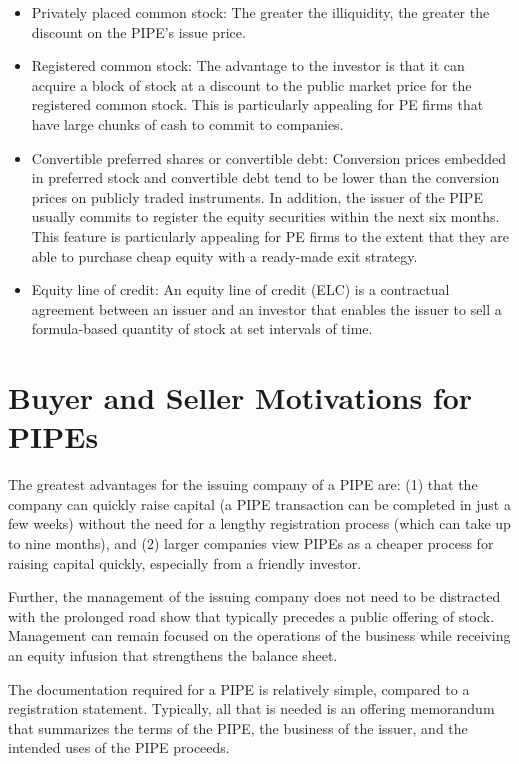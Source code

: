 \documentclass[11pt]{article}
\begin{document}
\begin{itemize}
  \item Privately placed common stock: The greater the illiquidity, the greater the discount on the PIPE's issue price.
  \item Registered common stock: The advantage to the investor is that it can acquire a block of stock at a discount to the public market price for the registered common stock. This is particularly appealing for PE firms that have large chunks of cash to commit to companies.
  \item Convertible preferred shares or convertible debt: Conversion prices embedded in preferred stock and convertible debt tend to be lower than the conversion prices on publicly traded instruments. In addition, the issuer of the PIPE usually commits to register the equity securities within the next six months. This feature is particularly appealing for PE firms to the extent that they are able to purchase cheap equity with a ready-made exit strategy.
  \item Equity line of credit: An equity line of credit (ELC) is a contractual agreement between an issuer and an investor that enables the issuer to sell a formula-based quantity of stock at set intervals of time.
\end{itemize}

\section*{Buyer and Seller Motivations for PIPEs}
The greatest advantages for the issuing company of a PIPE are: (1) that the company can quickly raise capital (a PIPE transaction can be completed in just a few weeks) without the need for a lengthy registration process (which can take up to nine months), and (2) larger companies view PIPEs as a cheaper process for raising capital quickly, especially from a friendly investor.

Further, the management of the issuing company does not need to be distracted with the prolonged road show that typically precedes a public offering of stock. Management can remain focused on the operations of the business while receiving an equity infusion that strengthens the balance sheet.

The documentation required for a PIPE is relatively simple, compared to a registration statement. Typically, all that is needed is an offering memorandum that summarizes the terms of the PIPE, the business of the issuer, and the intended uses of the PIPE proceeds.
\end{document}
